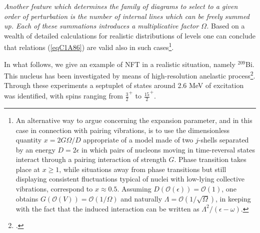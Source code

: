 \textit{Another feature which determines the family of diagrams to select to a given order of perturbation is the number of internal lines which can be freely summed up. Each of these summations introduces a multiplicative factor $\Omega$.} Based on a wealth of detailed calculations for realistic distributions of levels one can conclude that  relations (\ref{eqC1A86}) are valid also in such cases\footnote{\label{fn107} An alternative way to argue concerning the expansion parameter, and in this case in connection with pairing vibrations, is to use the dimensionless quantity $x=2G\Omega/D$ appropriate of a model made of two $j$-shells separated by an energy $D=2\epsilon$ in which pairs of nucleons moving in time-reversal states interact through a pairing interaction of strength $G$. Phase transition takes place at $x\geq1$, while situations away from phase transitions but still displaying consistent fluctuations typical of nuclei with low-lying collective vibrations, correspond to $x\approx0.5$. Assuming $D(\mathcal O(\epsilon))=\mathcal O(1)$, one obtains $G(\mathcal O(V))=\mathcal O(1/\Omega)$ and naturally $\Lambda=\mathcal O(1/\sqrt{\Omega})$, in keeping with the fact that the induced interaction can be written as $\Lambda^2/(\epsilon-\omega)$.}.


  In what follows, we give an example of NFT in a realistic situation, namely $^{209}$Bi. 
This nucleus has been investigated by means of high-resolution anelastic process\footnote{\cite{Ungrin:71}.}. Through these experiments a septuplet of states around 2.6 MeV of excitation was identified, with spins 
ranging from $\frac{3}{2}^+$ to $\frac{15}{2}^+$. 


